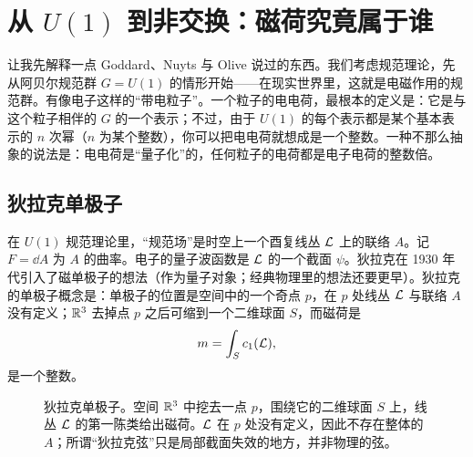 \section{从 $U(1)$ 到非交换：磁荷究竟属于谁}

\par\medskip

让我先解释一点 Goddard、Nuyts 与 Olive 说过的东西。我们考虑规范理论，先从阿贝尔规范群 $G=U(1)$ 的情形开始——在现实世界里，这就是电磁作用的规范群。有像电子这样的“带电粒子”。一个粒子的电电荷，最根本的定义是：它是与这个粒子相伴的 $G$ 的一个表示；不过，由于 $U(1)$ 的每个表示都是某个基本表示的 $n$ 次幂（$n$ 为某个整数），你可以把电电荷就想成是一个整数。一种不那么抽象的说法是：电电荷是“量子化”的，任何粒子的电荷都是电子电荷的整数倍。

\subsection{狄拉克单极子}

在 $U(1)$ 规范理论里，“规范场”是时空上一个酉复线丛 $\mathcal{L}$ 上的联络 $A$。记 $F=\dd A$ 为 $A$ 的曲率。电子的量子波函数是 $\mathcal{L}$ 的一个截面 $\psi$。狄拉克在 1930 年代引入了磁单极子的想法（作为量子对象；经典物理里的想法还要更早）。狄拉克的单极子概念是：单极子的位置是空间中的一个奇点 $p$，在 $p$ 处线丛 $\mathcal{L}$ 与联络 $A$ 没有定义；$\mathbb{R}^3$ 去掉点 $p$ 之后可缩到一个二维球面 $S$，而磁荷是
\[
  m=\int_S c_1(\mathcal{L}),
\]
是一个整数。

\begin{figure}[htbp]
\centering
{}
\caption{狄拉克单极子。空间 $\mathbb{R}^3$ 中挖去一点 $p$，围绕它的二维球面 $S$ 上，线丛 $\mathcal{L}$ 的第一陈类给出磁荷。$\mathcal{L}$ 在 $p$ 处没有定义，因此不存在整体的 $A$；所谓“狄拉克弦”只是局部截面失效的地方，并非物理的弦。}
\label{fig:dirac}
\end{figure}

